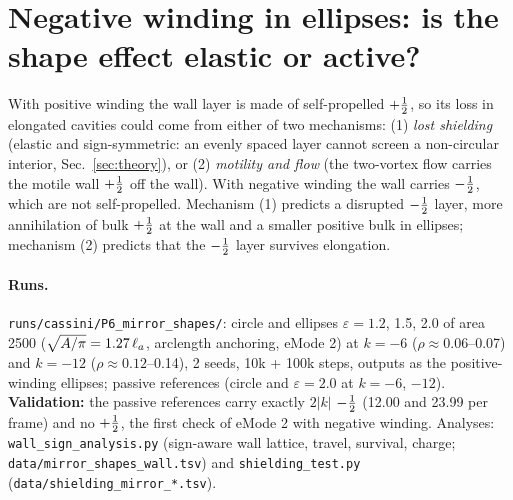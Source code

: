 \section{Negative winding in ellipses: is the shape effect elastic or active?}\label{sec:smirror}
With positive winding the wall layer is made of self-propelled $+\tfrac12$, so its loss in elongated cavities could come from either of two
mechanisms: (1) \emph{lost shielding} (elastic and sign-symmetric: an evenly spaced layer cannot screen a non-circular interior,
Sec.~\ref{sec:theory}), or (2) \emph{motility and flow} (the two-vortex flow carries the motile wall $+\tfrac12$ off the wall). With negative winding
the wall carries $-\tfrac12$, which are not self-propelled. Mechanism (1) predicts a disrupted $-\tfrac12$ layer, more annihilation of bulk $+\tfrac12$ at the
wall and a smaller positive bulk in ellipses; mechanism (2) predicts that the $-\tfrac12$ layer survives elongation.

\paragraph{Runs.} \texttt{runs/cassini/P6\_mirror\_shapes/}: circle and ellipses $\varepsilon=1.2$, 1.5, 2.0 of area 2500 ($\sqrt{A/\pi}=1.27\,\ell_a$,
arclength anchoring, eMode 2) at $k=-6$ ($\rho\approx0.06$--0.07) and $k=-12$ ($\rho\approx0.12$--0.14), 2 seeds, 10k + 100k steps, outputs as the
positive-winding ellipses; passive references (circle and $\varepsilon=2.0$ at $k=-6$, $-12$). \textbf{Validation:} the passive references carry
exactly $2|k|$ $-\tfrac12$ (12.00 and 23.99 per frame) and no $+\tfrac12$, the first check of eMode 2 with negative winding.
Analyses: \texttt{wall\_sign\_analysis.py} (sign-aware wall lattice, travel, survival, charge; \texttt{data/mirror\_shapes\_wall.tsv}) and
\texttt{shielding\_test.py} (\texttt{data/shielding\_mirror\_*.tsv}).

